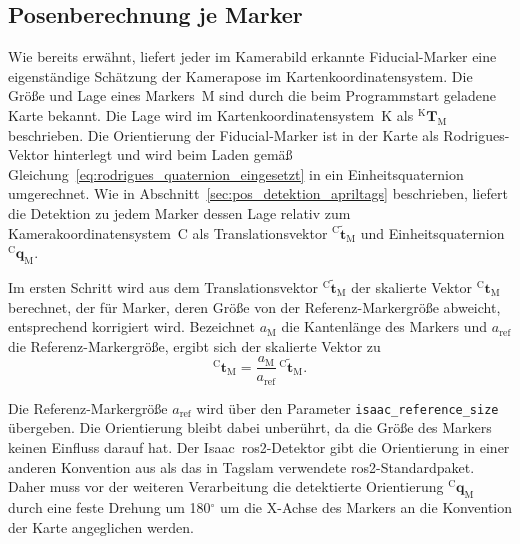 \subsection*{Posenberechnung je Marker}
\label{subsec:pos_posenberechnung}
Wie bereits erwähnt, liefert jeder im Kamerabild erkannte Fiducial-Marker eine eigenständige Schätzung der Kamerapose im Kartenkoordinatensystem.
Die Größe und Lage eines Markers~$\mathrm{M}$ sind durch die beim Programmstart geladene Karte bekannt.
Die Lage wird im Kartenkoordinatensystem~$\mathrm{K}$ als $^{\mathrm{K}}\mathbf{T}_{\mathrm{M}}$ beschrieben.
Die Orientierung der Fiducial-Marker ist in der Karte als Rodrigues-Vektor hinterlegt und wird beim Laden gemäß
Gleichung~\ref{eq:rodrigues_quaternion_eingesetzt} in ein Einheitsquaternion umgerechnet.
Wie in Abschnitt~\ref{sec:pos_detektion_apriltags} beschrieben, liefert die Detektion zu jedem Marker
dessen Lage relativ zum Kamerakoordinatensystem~$\mathrm{C}$ als Translationsvektor $^{\mathrm{C}}\tilde{\mathbf{t}}_{\mathrm{M}}$ und
Einheitsquaternion $^{\mathrm{C}}\mathbf{q}_{\mathrm{M}}$.

Im ersten Schritt wird aus dem Translationsvektor $^{\mathrm{C}}\tilde{\mathbf{t}}_{\mathrm{M}}$
der skalierte Vektor $^{\mathrm{C}}\mathbf{t}_{\mathrm{M}}$ berechnet, der für Marker, deren Größe von der
Referenz-Markergröße abweicht, entsprechend korrigiert wird.
Bezeichnet $a_{\mathrm{M}}$ die Kantenlänge des Markers und $a_{\mathrm{ref}}$ die Referenz-Markergröße, ergibt sich der skalierte Vektor zu
\begin{equation}
^{\mathrm{C}}\mathbf{t}_{\mathrm{M}} = \frac{a_{\mathrm{M}}}{a_{\mathrm{ref}}}\,{^{\mathrm{C}}\tilde{\mathbf{t}}_{\mathrm{M}}}.
\label{eq:pos_skalierung}
\end{equation}


Die Referenz-Markergröße $a_{\mathrm{ref}}$ wird über den Parameter \texttt{isaac\_reference\_size} übergeben.
Die Orientierung bleibt dabei unberührt, da die Größe des Markers keinen Einfluss darauf hat.
Der Isaac~\gls{ros2}-Detektor gibt die Orientierung in einer anderen Konvention aus als das in Tag\gls{slam} verwendete \gls{ros2}-Standardpaket.
Daher muss vor der weiteren Verarbeitung die detektierte Orientierung $^{\mathrm{C}}\mathbf{q}_{\mathrm{M}}$ durch eine feste
Drehung um 180$^\circ$ um die X-Achse des Markers an die Konvention der Karte angeglichen werden.

